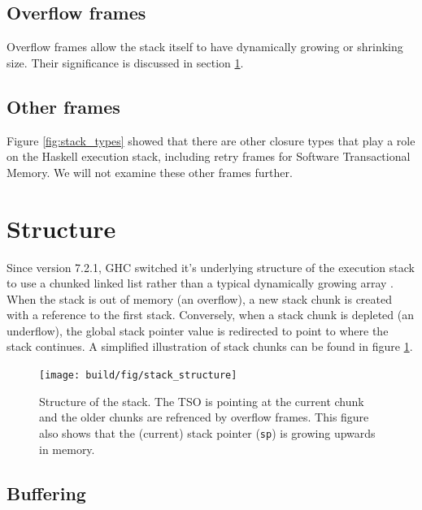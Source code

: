\subsection{Overflow frames}

Overflow frames allow the stack itself to have dynamically growing or
shrinking size. Their significance is discussed in section \ref{sec:structure_of_stack}.

\subsection{Other frames}

Figure \ref{fig:stack_types} showed that there are other closure types
that play a role on the Haskell execution stack, including retry frames
for Software Transactional Memory. We will not examine these other
frames further.

\section{Structure} \label{sec:structure_of_stack}

Since version 7.2.1, GHC switched it's underlying structure of the
execution stack to use a chunked linked list rather than a typical
dynamically growing array \cite{ghc_blog_overhaul_of_stack_management}
\cite{ghc_changeset_stack_chunks}. When the stack
is out of memory (an overflow), a new stack chunk is created with a reference
to the first stack. Conversely, when a stack chunk is depleted (an underflow),
the global stack pointer value is redirected to point to where the stack continues.
A simplified illustration of stack chunks can be found in figure \ref{fig:stack_structure}.

\begin{figure}
\begin{mdframed}
  \texttt{[image: build/fig/stack\_structure]}
  \caption{Structure of the stack. The TSO is pointing at the current
  chunk and the older chunks are refrenced by overflow frames. This
  figure also shows that the (current) stack pointer (\texttt{sp}) is
  growing upwards in memory.}
  \label{fig:stack_structure}
\end{mdframed}
\end{figure}

\subsection{Buffering}

